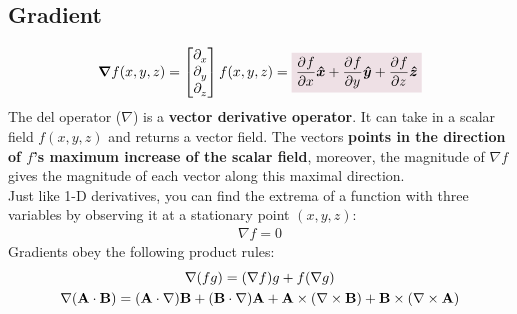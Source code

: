     \subsection*{Gradient}
        \begin{align*}
            \grad f(x,y,z) = 
            \begin{bmatrix}
                \pder*{x}
                \\
                \pder*{y}
                \\
                \pder*{z}
            \end{bmatrix}
            f(x,y,z) = \coloredanswer{\pder{f}{x}\e{x}+\pder{f}{y}\e{y}+\pder{f}{z}\e{z}}
        \end{align*}
        The del operator ($\nabla$) is a \textcolor{Blue1}{\bf vector derivative operator}. It can take in a scalar field $f(x,y,z)$ and returns a vector field. The vectors \textcolor{Blue1}{\bf points in the direction of \(f\)'s maximum increase of the scalar field}, moreover, the magnitude of \(\nabla f\) gives the magnitude of each vector along this maximal direction.
        \\[0.5 cm]
        Just like 1-D derivatives, you can find the extrema of a function with three variables by observing it at a stationary point \((x,y,z)\):
        \begin{align*}
            \nabla f = 0 
        \end{align*}
        Gradients obey the following product rules:
        \begin{gather*}
            \nabla (fg) = (\nabla f)g + f (\nabla g) 
            \\
            \nabla (\vb{A} \cdot \vb{B}) 
            = (\vb{A} \cdot \nabla)\vb{B} + (\vb{B} \cdot \nabla)\vb{A}+ \vb{A} \times (\nabla \times \vb{B}) + \vb{B} \times(\nabla \times \vb{A}) \\
        \end{gather*}
